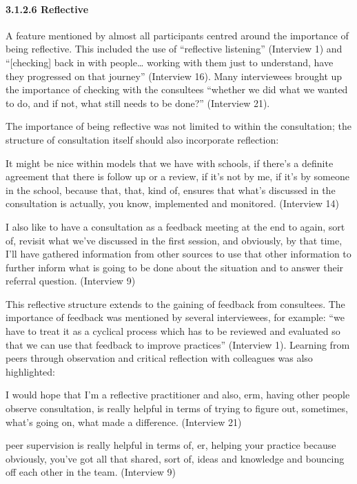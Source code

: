 \documentclass[
]{article}
\begin{document}
\hypertarget{reflective}{%
\paragraph{3.1.2.6 Reflective}\label{reflective}}

A feature mentioned by almost all participants centred around the
importance of being reflective. This included the use of ``reflective
listening'' (Interview 1) and ``{[}checking{]} back in with
people\ldots{} working with them just to understand, have they
progressed on that journey'' (Interview 16). Many interviewees brought
up the importance of checking with the consultees ``whether we did what
we wanted to do, and if not, what still needs to be done?'' (Interview
21).

The importance of being reflective was not limited to within the
consultation; the structure of consultation itself should also
incorporate reflection:

It might be nice within models that we have with schools, if there's a
definite agreement that there is follow up or a review, if it's not by
me, if it's by someone in the school, because that, that, kind of,
ensures that what's discussed in the consultation is actually, you know,
implemented and monitored. (Interview 14)

I also like to have a consultation as a feedback meeting at the end to
again, sort of, revisit what we've discussed in the first session, and
obviously, by that time, I'll have gathered information from other
sources to use that other information to further inform what is going to
be done about the situation and to answer their referral question.
(Interview 9)

This reflective structure extends to the gaining of feedback from
consultees. The importance of feedback was mentioned by several
interviewees, for example: ``we have to treat it as a cyclical process
which has to be reviewed and evaluated so that we can use that feedback
to improve practices'' (Interview 1). Learning from peers through
observation and critical reflection with colleagues was also
highlighted:

I would hope that I'm a reflective practitioner and also, erm, having
other people observe consultation, is really helpful in terms of trying
to figure out, sometimes, what's going on, what made a difference.
(Interview 21)

peer supervision is really helpful in terms of, er, helping your
practice because obviously, you've got all that shared, sort of, ideas
and knowledge and bouncing off each other in the team. (Interview 9)
\end{document}
